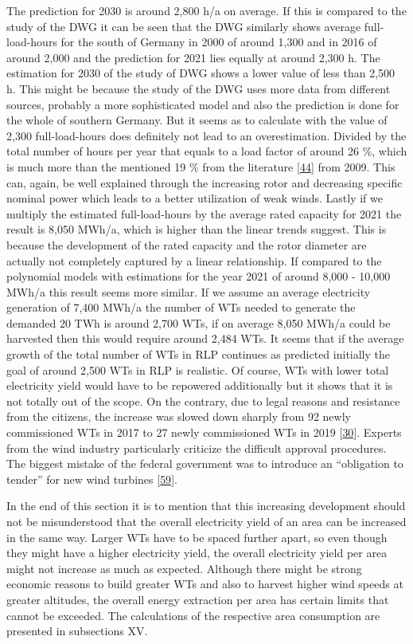 \documentclass[a4paper,11pt]{article}
\begin{document}
The prediction for 2030 is around 2,800 h/a on average. If this is compared to the study of the DWG it can be seen that the DWG similarly shows average full-load-hours for the south of Germany in 2000 of around 1,300 and in 2016 of around 2,000 and the prediction for 2021 lies equally at around 2,300 h. The estimation for 2030 of the study of DWG shows a lower value of less than 2,500 h. This might be because the study of the DWG uses more data from different sources, probably a more sophisticated model and also the prediction is done for the whole of southern Germany. But it seems as to calculate with the value of 2,300 full-load-hours does definitely not lead to an overestimation. Divided by the total number of hours per year that equals to a load factor of around 26 \%, which is much more than the mentioned 19 \% from the literature {[}\protect\hyperlink{ref-DavidJCMacKay.2009}{44}{]} from 2009. This can, again, be well explained through the increasing rotor and decreasing specific nominal power which leads to a better utilization of weak winds. Lastly if we multiply the estimated full-load-hours by the average rated capacity for 2021 the result is 8,050 MWh/a, which is higher than the linear trends suggest. This is because the development of the rated capacity and the rotor diameter are actually not completely captured by a linear relationship. If compared to the polynomial models with estimations for the year 2021 of around 8,000 - 10,000 MWh/a this result seems more similar. If we assume an average electricity generation of 7,400 MWh/a the number of WTs needed to generate the demanded 20 TWh is around 2,700 WTs, if on average 8,050 MWh/a could be harvested then this would require around 2,484 WTs. It seems that if the average growth of the total number of WTs in RLP continues as predicted initially the goal of around 2,500 WTs in RLP is realistic. Of course, WTs with lower total electricity yield would have to be repowered additionally but it shows that it is not totally out of the scope. On the contrary, due to legal reasons and resistance from the citizens, the increase was slowed down sharply from 92 newly commissioned WTs in 2017 to 27 newly commissioned WTs in 2019 {[}\protect\hyperlink{ref-EnergieagenturRheinlandPfalz.2019}{30}{]}. Experts from the wind industry particularly criticize the difficult approval procedures. The biggest mistake of the federal government was to introduce an ``obligation to tender'' for new wind turbines {[}\protect\hyperlink{ref-NickSchader.2021}{59}{]}.

In the end of this section it is to mention that this increasing development should not be misunderstood that the overall electricity yield of an area can be increased in the same way. Larger WTs have to be spaced further apart, so even though they might have a higher electricity yield, the overall electricity yield per area might not increase as much as expected. Although there might be strong economic reasons to build greater WTs and also to harvest higher wind speeds at greater altitudes, the overall energy extraction per area has certain limits that cannot be exceeded. The calculations of the respective area consumption are presented in subsections XV.
\end{document}
